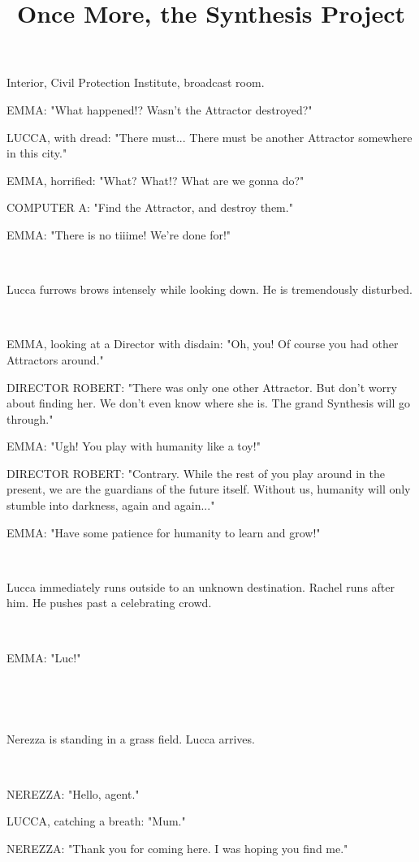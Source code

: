 \documentclass[11pt]{article}
\begin{document}
\ttfamily
\title{Once More, the Synthesis Project}
\maketitle



Interior, Civil Protection Institute, broadcast room. 

EMMA: "What happened!?
Wasn't the Attractor destroyed?"

LUCCA, with dread: "There must...
There must be another Attractor somewhere in this city."

EMMA, horrified: "What? What!? What are we gonna do?"

COMPUTER A: "Find the Attractor, and destroy them."

EMMA: "There is no tiiime! We're done for!"

\ 

Lucca furrows brows intensely while looking down. 
He is tremendously disturbed.

\ 

EMMA, looking at a Director with disdain: "Oh, you! 
Of course you had other Attractors around."

DIRECTOR ROBERT: "There was only one other Attractor. 
But don't worry about finding her. 
We don't even know where she is.
The grand Synthesis will go through."

EMMA: "Ugh! You play with humanity like a toy!"

DIRECTOR ROBERT: "Contrary. 
While the rest of you play around in the present, we are the guardians of the future itself.
Without us, humanity will only stumble into darkness, again and again..."

EMMA: "Have some patience for humanity to learn and grow!"

\ 

Lucca immediately runs outside to an unknown destination.
Rachel runs after him.
He pushes past a celebrating crowd.

\ 

EMMA: "Luc!"

\ 

\ 

Nerezza is standing in a grass field.
Lucca arrives. 

\ 

NEREZZA: "Hello, agent."

LUCCA, catching a breath: "Mum."

NEREZZA: "Thank you for coming here. 
I was hoping you find me."
\end{document}
